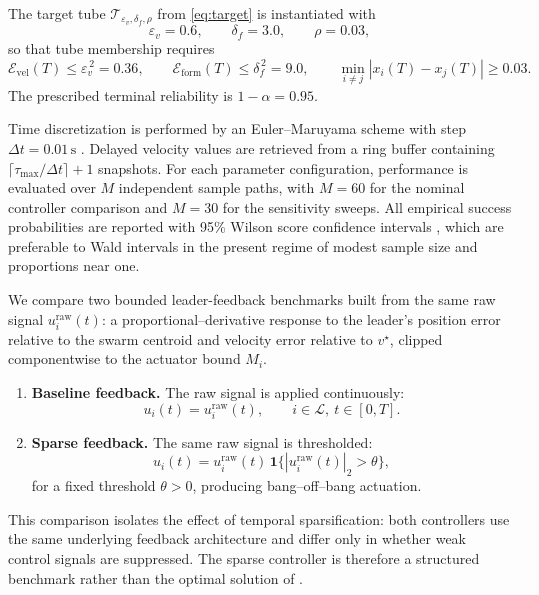 \documentclass[pdflatex,sn-mathphys-num]{sn-jnl}%
\numberwithin{equation}{section}
\theoremstyle{thmstyleone}%
\theoremstyle{remark}
\theoremstyle{definition}
\newcommand{\calL}{\mathcal{L}}
\newcommand{\calT}{\mathcal{T}}
\newcommand{\calE}{\mathcal{E}}
\newcommand{\vstar}{v^{\star}}
\begin{document}
The target tube $\calT_{\varepsilon_v,\delta_f,\rho}$ from \eqref{eq:target}
is instantiated with
\begin{equation}\label{eq:tolerances-num}
  \varepsilon_v = 0.6, \qquad
  \delta_f = 3.0, \qquad
  \rho = 0.03,
\end{equation}
so that tube membership requires
\[
  \calE_{\mathrm{vel}}(T)\le \varepsilon_v^{\,2}=0.36,\qquad
  \calE_{\mathrm{form}}(T)\le \delta_f^{\,2}=9.0,\qquad
  \min_{i\neq j}|x_i(T)-x_j(T)|\ge 0.03.
\]
The prescribed terminal reliability is $1-\alpha=0.95$.

Time discretization is performed by an Euler--Maruyama scheme with step
$\Delta t=0.01\,\mathrm{s}$ \cite{higham2001algorithmic}. Delayed velocity values are retrieved from a
ring buffer containing
$\lceil\tau_{\max}/\Delta t\rceil+1$ snapshots. For each
parameter configuration, performance is evaluated over $M$ independent
sample paths, with $M=60$ for the nominal controller comparison and
$M=30$ for the sensitivity sweeps. All empirical success probabilities are
reported with 95\% Wilson score confidence intervals
\cite{brown2001interval}, which are preferable to Wald intervals in the
present regime of modest sample size and proportions near one.

We compare two bounded leader-feedback benchmarks built from the same raw
signal $u_i^{\mathrm{raw}}(t)$: a proportional--derivative response to the
leader's position error relative to the swarm centroid and velocity error
relative to $\vstar$, clipped componentwise to the actuator bound $M_i$.
\begin{enumerate}[label=(\roman*)]
\item \textbf{Baseline feedback.} The raw signal is applied continuously:
\[
  u_i(t)=u_i^{\mathrm{raw}}(t), \qquad i\in\calL,\ t\in[0,T].
\]
\item \textbf{Sparse feedback.} The same raw signal is thresholded:
\[
  u_i(t)=u_i^{\mathrm{raw}}(t)\,\mathbf{1}\{|u_i^{\mathrm{raw}}(t)|_2>\theta\},
\]
for a fixed threshold $\theta>0$, producing bang--off--bang actuation.
\end{enumerate}
This comparison isolates the effect of temporal sparsification: both
controllers use the same underlying feedback architecture and differ only
in whether weak control signals are suppressed. The sparse controller is
therefore a structured benchmark rather than the optimal solution of
.
\end{document}
